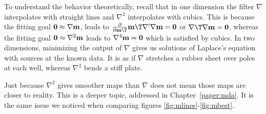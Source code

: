 \par
To understand the behavior theoretically,
recall that in one dimension 
the filter $\nabla$ interpolates with straight lines
and $\nabla^2$ interpolates with cubics.
This is because the fitting goal
$\bold 0 \approx \nabla \bold m$,
leads to
$\frac{\partial }{\partial \bold m\T} \bold m\T\nabla'\nabla \bold m = \bold 0$
or $\nabla\T\nabla \bold m = \bold 0$, whereas the fitting goal 
        $\bold 0 \approx \nabla^2 \bold m$
leads to
        $\nabla^4 \bold m = \bold 0$
which is satisfied by cubics.
In two dimensions, minimizing the output of $\nabla$
gives us solutions of Laplace's equation with sources at the known data.
It is as if $\nabla$ stretches a rubber sheet over poles at each well,
whereas $\nabla^2$ bends a stiff plate.
\par
Just because $\nabla^2$ gives smoother maps than  $\nabla$
does not mean those maps are closer to reality.
This is a deeper topic, addressed in Chapter~\ref{paper:mda}.
It is the same issue we noticed when comparing
figures \ref{fig:mlines}-\ref{fig:mbest}.

